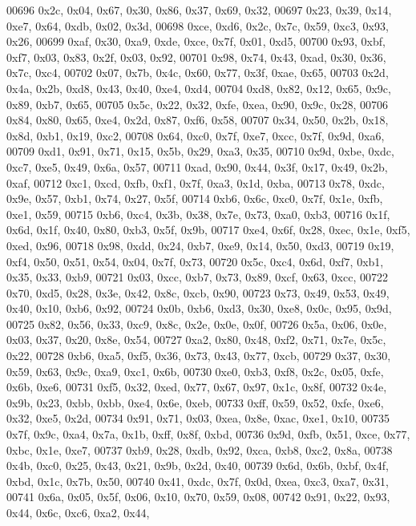 \begin{DoxyCode}
00696   0x2c, 0x04, 0x67, 0x30, 0x86, 0x37, 0x69, 0x32,
00697   0x23, 0x39, 0x14, 0xe7, 0x64, 0xdb, 0x02, 0x3d,
00698   0xce, 0xd6, 0x2c, 0x7c, 0x59, 0xc3, 0x93, 0x26,
00699   0xaf, 0x30, 0xa9, 0xde, 0xce, 0x7f, 0x01, 0xd5,
00700   0x93, 0xbf, 0xf7, 0x03, 0x83, 0x2f, 0x03, 0x92,
00701   0x98, 0x74, 0x43, 0xad, 0x30, 0x36, 0x7c, 0xc4,
00702   0x07, 0x7b, 0x4c, 0x60, 0x77, 0x3f, 0xae, 0x65,
00703   0x2d, 0x4a, 0x2b, 0xd8, 0x43, 0x40, 0xe4, 0xd4,
00704   0xd8, 0x82, 0x12, 0x65, 0x9c, 0x89, 0xb7, 0x65,
00705   0x5c, 0x22, 0x32, 0xfe, 0xea, 0x90, 0x9c, 0x28,
00706   0x84, 0x80, 0x65, 0xe4, 0x2d, 0x87, 0xf6, 0x58,
00707   0x34, 0x50, 0x2b, 0x18, 0x8d, 0xb1, 0x19, 0xc2,
00708   0x64, 0xc0, 0x7f, 0xe7, 0xcc, 0x7f, 0x9d, 0xa6,
00709   0xd1, 0x91, 0x71, 0x15, 0x5b, 0x29, 0xa3, 0x35,
00710   0x9d, 0xbe, 0xdc, 0xc7, 0xe5, 0x49, 0x6a, 0x57,
00711   0xad, 0x90, 0x44, 0x3f, 0x17, 0x49, 0x2b, 0xaf,
00712   0xc1, 0xcd, 0xfb, 0xf1, 0x7f, 0xa3, 0x1d, 0xba,
00713   0x78, 0xdc, 0x9e, 0x57, 0xb1, 0x74, 0x27, 0x5f,
00714   0xb6, 0x6c, 0xc0, 0x7f, 0x1e, 0xfb, 0xe1, 0x59,
00715   0xb6, 0xc4, 0x3b, 0x38, 0x7e, 0x73, 0xa0, 0xb3,
00716   0x1f, 0x6d, 0x1f, 0x40, 0x80, 0xb3, 0x5f, 0x9b,
00717   0xe4, 0x6f, 0x28, 0xec, 0x1e, 0xf5, 0xed, 0x96,
00718   0x98, 0xdd, 0x24, 0xb7, 0xe9, 0x14, 0x50, 0xd3,
00719   0x19, 0xf4, 0x50, 0x51, 0x54, 0x04, 0x7f, 0x73,
00720   0x5c, 0xc4, 0x6d, 0xf7, 0xb1, 0x35, 0x33, 0xb9,
00721   0x03, 0xcc, 0xb7, 0x73, 0x89, 0xcf, 0x63, 0xcc,
00722   0x70, 0xd5, 0x28, 0x3e, 0x42, 0x8c, 0xcb, 0x90,
00723   0x73, 0x49, 0x53, 0x49, 0x40, 0x10, 0xb6, 0x92,
00724   0x0b, 0xb6, 0xd3, 0x30, 0xe8, 0x0c, 0x95, 0x9d,
00725   0x82, 0x56, 0x33, 0xc9, 0x8c, 0x2e, 0x0e, 0x0f,
00726   0x5a, 0x06, 0x0e, 0x03, 0x37, 0x20, 0x8e, 0x54,
00727   0xa2, 0x80, 0x48, 0xf2, 0x71, 0x7e, 0x5c, 0x22,
00728   0xb6, 0xa5, 0xf5, 0x36, 0x73, 0x43, 0x77, 0xcb,
00729   0x37, 0x30, 0x59, 0x63, 0x9c, 0xa9, 0xc1, 0x6b,
00730   0xe0, 0xb3, 0xf8, 0x2c, 0x05, 0xfe, 0x6b, 0xe6,
00731   0xf5, 0x32, 0xed, 0x77, 0x67, 0x97, 0x1c, 0x8f,
00732   0x4e, 0x9b, 0x23, 0xbb, 0xbb, 0xe4, 0x6e, 0xeb,
00733   0xff, 0x59, 0x52, 0xfe, 0xe6, 0x32, 0xe5, 0x2d,
00734   0x91, 0x71, 0x03, 0xea, 0x8e, 0xac, 0xe1, 0x10,
00735   0x7f, 0x9c, 0xa4, 0x7a, 0x1b, 0xff, 0x8f, 0xbd,
00736   0x9d, 0xfb, 0x51, 0xce, 0x77, 0xbc, 0x1e, 0xe7,
00737   0xb9, 0x28, 0xdb, 0x92, 0xca, 0xb8, 0xc2, 0x8a,
00738   0x4b, 0xc0, 0x25, 0x43, 0x21, 0x9b, 0x2d, 0x40,
00739   0x6d, 0x6b, 0xbf, 0x4f, 0xbd, 0x1c, 0x7b, 0x50,
00740   0x41, 0xdc, 0x7f, 0x0d, 0xea, 0xc3, 0xa7, 0x31,
00741   0x6a, 0x05, 0x5f, 0x06, 0x10, 0x70, 0x59, 0x08,
00742   0x91, 0x22, 0x93, 0x44, 0x6c, 0xc6, 0xa2, 0x44,

\end{DoxyCode}

